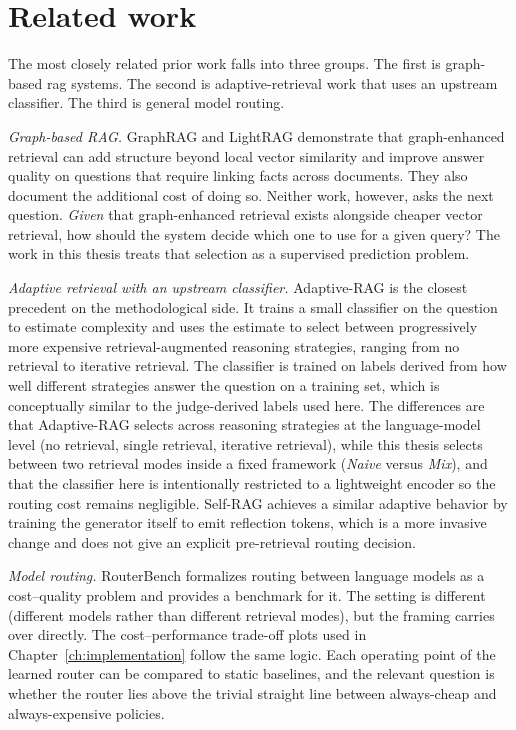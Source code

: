 \documentclass[english, bibtex]{kththesis}               %
\numberwithin{listing}{chapter}
\begin{document}
\section{Related work}
\label{sec:relatedWork}

The most closely related prior work falls into three groups. The first is graph-based \gls{rag} systems. The second is adaptive-retrieval work that uses an upstream classifier. The third is general model routing.

\emph{Graph-based RAG.} GraphRAG \cite{edge2024graphrag} and LightRAG \cite{lightrag2024} demonstrate that graph-enhanced retrieval can add structure beyond local vector similarity and improve answer quality on questions that require linking facts across documents. They also document the additional cost of doing so. Neither work, however, asks the next question. \emph{Given} that graph-enhanced retrieval exists alongside cheaper vector retrieval, how should the system decide which one to use for a given query? The work in this thesis treats that selection as a supervised prediction problem.

\emph{Adaptive retrieval with an upstream classifier.} Adaptive-RAG \cite{jeong2024adaptiverag} is the closest precedent on the methodological side. It trains a small classifier on the question to estimate complexity and uses the estimate to select between progressively more expensive retrieval-augmented reasoning strategies, ranging from no retrieval to iterative retrieval. The classifier is trained on labels derived from how well different strategies answer the question on a training set, which is conceptually similar to the judge-derived labels used here. The differences are that Adaptive-RAG selects across reasoning strategies at the language-model level (no retrieval, single retrieval, iterative retrieval), while this thesis selects between two retrieval modes inside a fixed framework (\emph{Naive} versus \emph{Mix}), and that the classifier here is intentionally restricted to a lightweight encoder so the routing cost remains negligible. Self-RAG \cite{asai2023selfrag} achieves a similar adaptive behavior by training the generator itself to emit reflection tokens, which is a more invasive change and does not give an explicit pre-retrieval routing decision.

\emph{Model routing.} RouterBench \cite{hu2024routerbench} formalizes routing between language models as a cost--quality problem and provides a benchmark for it. The setting is different (different models rather than different retrieval modes), but the framing carries over directly. The cost--performance trade-off plots used in Chapter~\ref{ch:implementation} follow the same logic. Each operating point of the learned router can be compared to static baselines, and the relevant question is whether the router lies above the trivial straight line between always-cheap and always-expensive policies.
\end{document}
